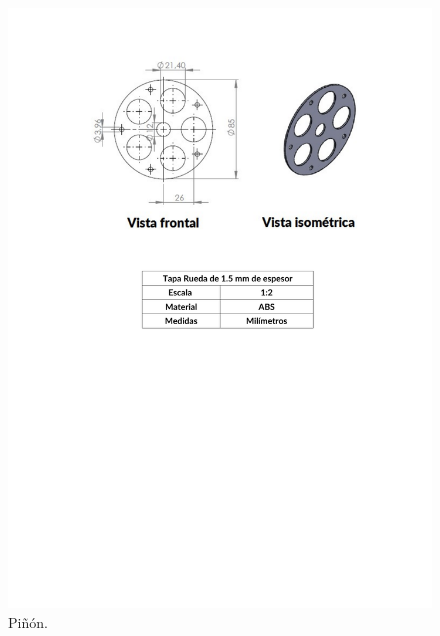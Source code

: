 \documentclass{article}
\begin{document}
\begin{figure}[ht]
\centering
\includegraphics[width=\textwidth]{PlanoTapaRueda.pdf}
\caption{Piñón.}
\end{figure}
\end{document}
